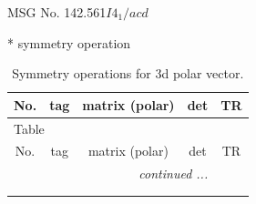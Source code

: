 \documentclass[fleqn,8pt]{jsarticle}
\begin{document}
\setcounter{MaxMatrixCols}{32}

\renewcommand{\tablename}{Table~}
\renewcommand{\figurename}{Figure~}
\begin{center}
\LARGE
MSG No. 142.561\quad$I4_{1}/acd$
\end{center}
* symmetry operation
\renewcommand{\arraystretch}{1.3}
\begin{longtable}{ccccc}
\caption{Symmetry operations for 3d polar vector.}
 \\
 \hline \hline
No. & tag & matrix (polar) & det & TR \\ \hline \endfirsthead

\multicolumn{4}{l}{\tablename\ \thetable{}} \\
 \hline \hline
No. & tag & matrix (polar) & det & TR \\ \hline \endhead

 \hline \hline
\multicolumn{4}{r}{\footnotesize\it continued ...} \\ \endfoot

 \hline \hline
\multicolumn{4}{r}{} \\ \endlastfoot


\end{longtable}
\end{document}
